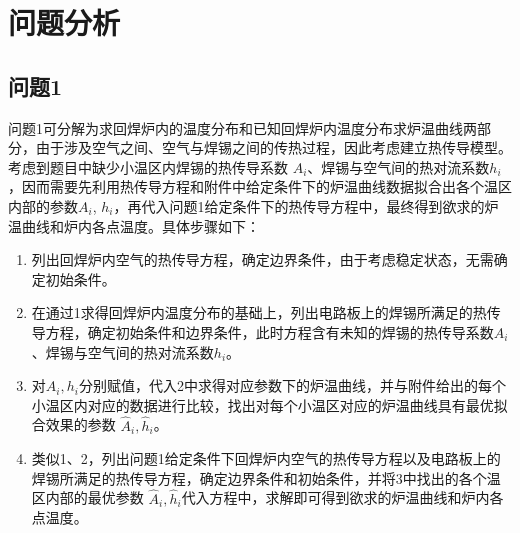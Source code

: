 \documentclass[../main.tex]{subfiles}
\begin{document}
\section{问题分析}
\subsection{问题1}
问题1可分解为求回焊炉内的温度分布和已知回焊炉内温度分布求炉温曲线两部分，由于涉及空气之间、空气与焊锡之间的传热过程，因此考虑建立热传导模型。考虑到题目中缺少小温区内焊锡的热传导系数 \(A_i\)、焊锡与空气间的热对流系数\(h_i\)，因而需要先利用热传导方程和附件中给定条件下的炉温曲线数据拟合出各个温区内部的参数\(A_{i}\), \(h_{i}\)，再代入问题1给定条件下的热传导方程中，最终得到欲求的炉温曲线和炉内各点温度。具体步骤如下：
\begin{enumerate}
\item 列出回焊炉内空气的热传导方程，确定边界条件，由于考虑稳定状态，无需确定初始条件。
\item 在通过1求得回焊炉内温度分布的基础上，列出电路板上的焊锡所满足的热传导方程，确定初始条件和边界条件，此时方程含有未知的焊锡的热传导系数\(A_{i}\)、焊锡与空气间的热对流系数\(h_{i}\)。
\item 对\(A_{i}, h_{i}\)分别赋值，代入2中求得对应参数下的炉温曲线，并与附件给出的每个小温区内对应的数据进行比较，找出对每个小温区对应的炉温曲线具有最优拟合效果的参数 \(\hat A _{i} , \hat h_{i}\)。
\item 类似1、2，列出问题1给定条件下回焊炉内空气的热传导方程以及电路板上的焊锡所满足的热传导方程，确定边界条件和初始条件，并将3中找出的各个温区内部的最优参数 \(\hat A _{i} , \hat h _{i}\)代入方程中，求解即可得到欲求的炉温曲线和炉内各点温度。
\end{enumerate}
\end{document}
